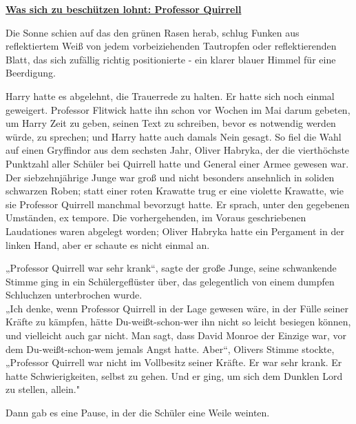 

\hypertarget{was-sich-zu-beschuxfctzen-lohnt-professor-quirrell}{%

\textbf{\uline{Was sich zu beschützen lohnt: Professor Quirrell}}

\hfill\break Die Sonne schien auf das den grünen Rasen herab, schlug Funken aus reflektiertem Weiß von jedem vorbeiziehenden Tautropfen oder reflektierenden Blatt, das sich zufällig richtig positionierte - ein klarer blauer Himmel für eine Beerdigung.

Harry hatte es abgelehnt, die Trauerrede zu halten. Er hatte sich noch einmal geweigert. Professor Flitwick hatte ihn schon vor Wochen im Mai darum gebeten, um Harry Zeit zu geben, seinen Text zu schreiben, bevor es notwendig werden würde, zu sprechen; und Harry hatte auch damals Nein gesagt. So fiel die Wahl auf einen Gryffindor aus dem sechsten Jahr, Oliver Habryka, der die vierthöchste Punktzahl aller Schüler bei Quirrell hatte und General einer Armee gewesen war. Der siebzehnjährige Junge war groß und nicht besonders ansehnlich in soliden schwarzen Roben; statt einer roten Krawatte trug er eine violette Krawatte, wie sie Professor Quirrell manchmal bevorzugt hatte. Er sprach, unter den gegebenen Umständen, ex tempore. Die vorhergehenden, im Voraus geschriebenen Laudationes waren abgelegt worden; Oliver Habryka hatte ein Pergament in der linken Hand, aber er schaute es nicht einmal an.

„Professor Quirrell war sehr krank“, sagte der große Junge, seine schwankende Stimme ging in ein Schülergeflüster über, das gelegentlich von einem dumpfen Schluchzen unterbrochen wurde.\\ „Ich denke, wenn Professor Quirrell in der Lage gewesen wäre, in der Fülle seiner Kräfte zu kämpfen, hätte Du-weißt-schon-wer ihn nicht so leicht besiegen können, und vielleicht auch gar nicht. Man sagt, dass David Monroe der Einzige war, vor dem Du-weißt-schon-wem jemals Angst hatte. Aber“, Olivers Stimme stockte, „Professor Quirrell war nicht im Vollbesitz seiner Kräfte. Er war sehr krank. Er hatte Schwierigkeiten, selbst zu gehen. Und er ging, um sich dem Dunklen Lord zu stellen, allein."

Dann gab es eine Pause, in der die Schüler eine Weile weinten.

}
